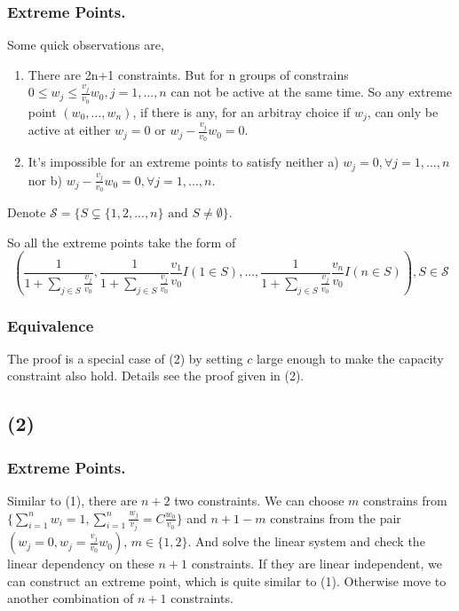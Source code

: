 \documentclass[11pt]{article}
\begin{document}
\hypertarget{extreme-points.}{%
\subsubsection{Extreme Points.}\label{extreme-points.}}

Some quick observations are,

\begin{enumerate}
\def\labelenumi{\arabic{enumi}.}
\item
  There are 2n+1 constraints. But for n groups of constrains
  \(0\leq w_j \leq \frac{v_j}{v_0}w_0, j=1,...,n\) can not be active at
  the same time. So any extreme point \((w_0,...,w_n)\), if there is
  any, for an arbitray choice if \(w_j\), can only be active at either
  \(w_j=0\) or \(w_j - \frac{v_j}{v_0}w_0=0\).
\item
  It's impossible for an extreme points to satisfy neither a)
  \(w_j=0,\forall j =1,...,n\) nor b)
  \(w_j - \frac{v_j}{v_0}w_0=0,\forall j =1,...,n\).
\end{enumerate}

Denote
\(\mathcal{S}=\{S\subsetneq \{1,2,...,n\} \text{ and } S\neq \emptyset\}\).

So all the extreme points take the form of \[
(\frac{1}{1+\sum_{j\in S}\frac{v_j}{v_0}}, \frac{1}{1+\sum_{j\in S}\frac{v_j}{v_0}}\frac{v_1}{v_0}I(1\in S), ..., \frac{1}{1+\sum_{j\in S}\frac{v_j}{v_0}}\frac{v_n}{v_0}I(n\in S)), S \in \mathcal{S}
\]

\hypertarget{equivalence}{%
\subsubsection{Equivalence}\label{equivalence}}

The proof is a special case of (2) by setting \(c\) large enough to make
the capacity constraint also hold. Details see the proof given in (2).

    \hypertarget{section}{%
\subsection{(2)}\label{section}}

\hypertarget{extreme-points.}{%
\subsubsection{Extreme Points.}\label{extreme-points.}}

Similar to (1), there are \(n+2\) two constraints. We can choose \(m\)
constrains from
\(\{\sum_{i=1}^n w_i=1, \sum_{i=1}^n \frac{w_j}{v_j}=C\frac{w_0}{v_0}\}\)
and \(n+1-m\) constrains from the pair
\((w_j=0, w_j=\frac{v_j}{v_0}w_0)\), \(m \in \{1,2\}\). And solve the
linear system and check the linear dependency on these \(n+1\)
constraints. If they are linear independent, we can construct an extreme
point, which is quite similar to (1). Otherwise move to another
combination of \(n+1\) constraints.
\end{document}

